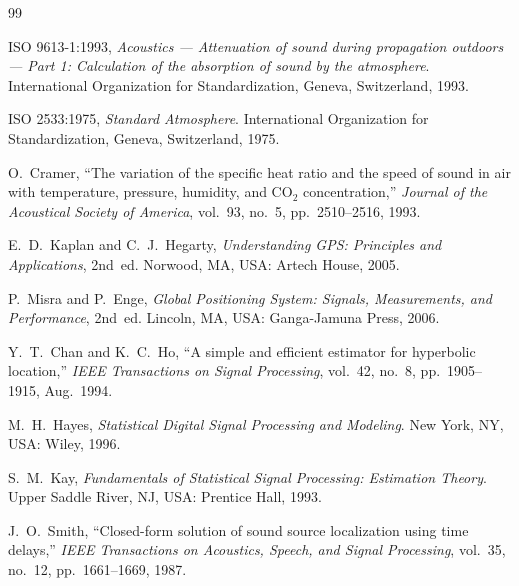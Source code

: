 \documentclass[a4paper,11pt]{article} %
\begin{document}
\begin{thebibliography}{99}

  ISO 9613-1:1993,
  \textit{Acoustics --- Attenuation of sound during propagation outdoors --- Part 1: Calculation of the absorption of sound by the atmosphere}.
  International Organization for Standardization, Geneva, Switzerland, 1993.
  
  ISO 2533:1975,
  \textit{Standard Atmosphere}.
  International Organization for Standardization, Geneva, Switzerland, 1975.
  
  O.~Cramer,
  ``The variation of the specific heat ratio and the speed of sound in air with temperature, pressure, humidity, and CO$_2$ concentration,''
  \textit{Journal of the Acoustical Society of America}, vol.~93, no.~5, pp.~2510--2516, 1993.
  
  
  E.~D.~Kaplan and C.~J.~Hegarty,
  \textit{Understanding GPS: Principles and Applications}, 2nd~ed.
  Norwood, MA, USA: Artech House, 2005.
  
  P.~Misra and P.~Enge,
  \textit{Global Positioning System: Signals, Measurements, and Performance}, 2nd~ed.
  Lincoln, MA, USA: Ganga-Jamuna Press, 2006.
  
  Y.~T.~Chan and K.~C.~Ho,
  ``A simple and efficient estimator for hyperbolic location,''
  \textit{IEEE Transactions on Signal Processing}, vol.~42, no.~8, pp.~1905--1915, Aug.~1994.
  
  
  M.~H.~Hayes,
  \textit{Statistical Digital Signal Processing and Modeling}.
  New York, NY, USA: Wiley, 1996.
  
  S.~M.~Kay,
  \textit{Fundamentals of Statistical Signal Processing: Estimation Theory}.
  Upper Saddle River, NJ, USA: Prentice Hall, 1993.
  
  
  J.~O.~Smith,
  ``Closed-form solution of sound source localization using time delays,''
  \textit{IEEE Transactions on Acoustics, Speech, and Signal Processing}, vol.~35, no.~12, pp.~1661--1669, 1987.
  
  \end{thebibliography}
\end{document}
